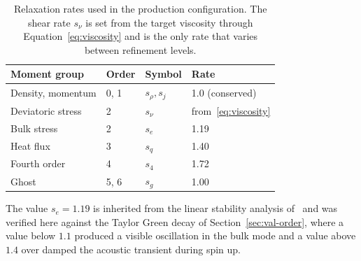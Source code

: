 \begin{table}[h]
\centering
\caption[Relaxation rates by moment order]{Relaxation rates used in the
production configuration. The shear rate $s_\nu$ is set from the target
viscosity through Equation~\eqref{eq:viscosity} and is the only rate that varies
between refinement levels.}
\label{tab:relaxation-rates}
\begin{tabular}{llll}
\toprule
Moment group & Order & Symbol & Rate \\
\midrule
Density, momentum   & 0, 1 & $s_\rho, s_j$ & 1.0 (conserved) \\
Deviatoric stress   & 2    & $s_\nu$       & from~\eqref{eq:viscosity} \\
Bulk stress         & 2    & $s_e$         & 1.19 \\
Heat flux           & 3    & $s_q$         & 1.40 \\
Fourth order        & 4    & $s_4$         & 1.72 \\
Ghost               & 5, 6 & $s_g$         & 1.00 \\
\bottomrule
\end{tabular}
\end{table}

The value $s_e = 1.19$ is inherited from the linear stability analysis
of~\citet{manov2017mrt} and was verified here against the Taylor Green decay of
Section~\ref{sec:val-order}, where a value below $1.1$ produced a visible
oscillation in the bulk mode and a value above $1.4$ over damped the acoustic
transient during spin up.
